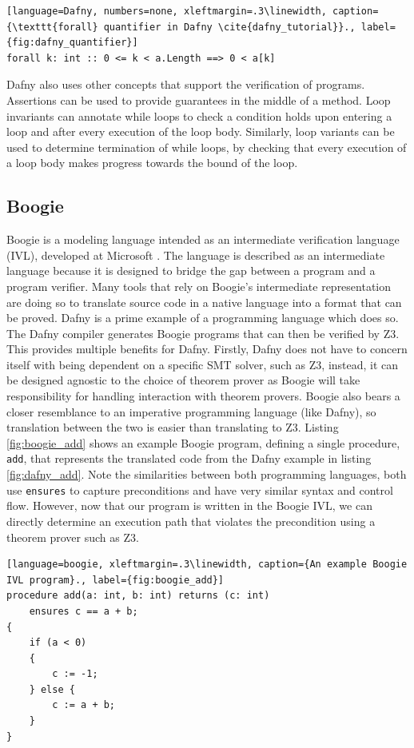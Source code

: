 \begin{lstlisting}[language=Dafny, numbers=none, xleftmargin=.3\linewidth, caption={\texttt{forall} quantifier in Dafny \cite{dafny_tutorial}}., label={fig:dafny_quantifier}]
forall k: int :: 0 <= k < a.Length ==> 0 < a[k]
\end{lstlisting}
\par
Dafny also uses other concepts that support the verification of programs. Assertions can be used to provide guarantees in the middle of a method. Loop invariants can annotate while loops to check a condition holds upon entering a loop and after every execution of the loop body. Similarly, loop variants can be used to determine termination of while loops, by checking that every execution of a loop body makes progress towards the bound of the loop.
\subsection[]{Boogie}
Boogie is a modeling language intended as an intermediate verification language (IVL), developed at Microsoft \cite{boogie}. The language is described as an intermediate language because it is designed to bridge the gap between a program and a program verifier. Many tools that rely on Boogie's intermediate representation are doing so to translate source code in a native language into a format that can be proved. Dafny is a prime example of a programming language which does so. The Dafny compiler generates Boogie programs that can then be verified by Z3. This provides multiple benefits for Dafny. Firstly, Dafny does not have to concern itself with being dependent on a specific SMT solver, such as Z3, instead, it can be designed agnostic to the choice of theorem prover as Boogie will take responsibility for handling interaction with theorem provers. Boogie also bears a closer resemblance to an imperative programming language (like Dafny), so translation between the two is easier than translating to Z3. Listing \ref{fig:boogie_add} shows an example Boogie program, defining a single procedure, \texttt{add}, that represents the translated code from the Dafny example in listing \ref{fig:dafny_add}. Note the similarities between both programming languages, both use \texttt{ensures} to capture preconditions and have very similar syntax and control flow. However, now that our program is written in the Boogie IVL, we can directly determine an execution path that violates the precondition using a theorem prover such as Z3.
\begin{lstlisting}[language=boogie, xleftmargin=.3\linewidth, caption={An example Boogie IVL program}., label={fig:boogie_add}]
procedure add(a: int, b: int) returns (c: int)
    ensures c == a + b;
{
    if (a < 0) 
    {
        c := -1;
    } else {
        c := a + b;
    }
}
\end{lstlisting}

